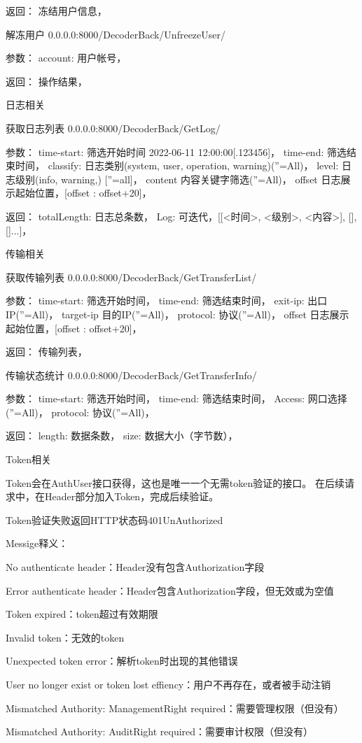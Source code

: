 返回：
冻结用户信息，

解冻用户
0.0.0.0:8000/DecoderBack/UnfreezeUser/

参数：
account: 用户帐号，

返回：
操作结果，

日志相关

获取日志列表
0.0.0.0:8000/DecoderBack/GetLog/

参数：
time-start: 筛选开始时间 2022-06-11 12:00:00[.123456]，
time-end: 筛选结束时间，
classify: 日志类别(system, user, operation, warning)(''=All)，
level: 日志级别(info, warning,) [''=all]，
content 内容关键字筛选(''=All)，
offset 日志展示起始位置，[offset : offset+20]，

返回：
totalLength: 日志总条数，
Log: 可迭代，[[<时间>, <级别>, <内容>], [], []...]，

传输相关

获取传输列表
0.0.0.0:8000/DecoderBack/GetTransferList/

参数：
time-start: 筛选开始时间，
time-end: 筛选结束时间，
exit-ip: 出口IP(''=All)，
target-ip 目的IP(''=All)，
protocol: 协议(''=All)，
offset 日志展示起始位置，[offset : offset+20]，

返回：
传输列表，

传输状态统计
0.0.0.0:8000/DecoderBack/GetTransferInfo/

参数：
time-start: 筛选开始时间，
time-end: 筛选结束时间，
Access: 网口选择(''=All)，
protocol: 协议(''=All)，

返回：
length: 数据条数，
size: 数据大小（字节数），

Token相关

Token会在AuthUser接口获得，这也是唯一一个无需token验证的接口。
在后续请求中，在Header部分加入Token，完成后续验证。

Token验证失败返回HTTP状态码401UnAuthorized

Messige释义：

No authenticate header：Header没有包含Authorization字段

Error authenticate header：Header包含Authorization字段，但无效或为空值

Token expired：token超过有效期限

Invalid token：无效的token

Unexpected token error：解析token时出现的其他错误

User no longer exist or token lost effiency：用户不再存在，或者被手动注销

Mismatched Authority: ManagementRight required：需要管理权限（但没有）

Mismatched Authority: AuditRight required：需要审计权限（但没有）

